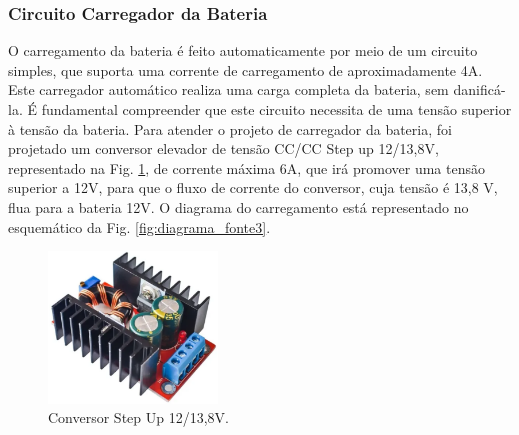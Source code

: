 \subsubsection*{Circuito Carregador da Bateria}

O carregamento da bateria é feito automaticamente por meio de um circuito simples, que suporta uma corrente de carregamento de aproximadamente 4A. Este carregador automático realiza uma carga completa da bateria, sem danificá-la. É fundamental compreender que este circuito necessita de uma tensão superior à tensão da bateria. Para atender o projeto de carregador da bateria, foi projetado um conversor elevador de tensão CC/CC Step up 12/13,8V, representado na Fig. \ref{fig:energia_stepup}, de corrente máxima 6A,  que irá promover uma tensão superior a 12V, para que o fluxo de corrente do conversor, cuja tensão é 13,8 V, flua para a bateria 12V. O diagrama do carregamento está representado no esquemático da Fig. \ref{fig:diagrama_fonte3}.

\begin{figure}[H]
\centering
    \includegraphics[width=0.4\textwidth]{figuras/energia/fotos_componentes/Energia_Stepup.png}
    \caption{Conversor Step Up 12/13,8V.}
    \label{fig:energia_stepup}
\end{figure}


